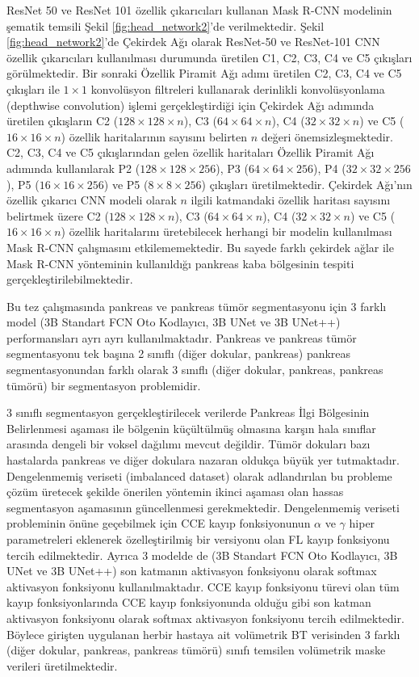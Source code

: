 ResNet 50 ve ResNet 101 özellik çıkarıcıları kullanan Mask R-CNN modelinin şematik temsili Şekil \ref{fig:head_network2}'de verilmektedir. Şekil \ref{fig:head_network2}'de Çekirdek Ağı olarak ResNet-50 ve ResNet-101 CNN özellik çıkarıcıları kullanılması durumunda üretilen C1, C2, C3, C4 ve C5 çıkışları görülmektedir. Bir sonraki Özellik Piramit Ağı adımı üretilen C2, C3, C4 ve C5 çıkışları ile $1 \times 1$ konvolüsyon filtreleri kullanarak derinlikli konvolüsyonlama (depthwise convolution) işlemi gerçekleştirdiği için Çekirdek Ağı adımında üretilen çıkışların C2 ($128 \times 128 \times n$), C3 ($64 \times 64 \times n$), C4 ($32 \times 32 \times n$) ve C5 ($16 \times 16 \times n$) özellik haritalarının sayısını belirten $n$ değeri önemsizleşmektedir. C2, C3, C4 ve C5 çıkışlarından gelen özellik haritaları Özellik Piramit Ağı adımında kullanılarak P2 ($128 \times 128 \times 256$), P3 ($64 \times 64 \times 256$), P4 ($32 \times 32 \times 256$), P5 ($16 \times 16 \times 256$) ve P5 ($8\times 8 \times 256$) çıkışları üretilmektedir. Çekirdek Ağı'nın özellik çıkarıcı CNN modeli olarak $n$ ilgili katmandaki özellik haritası sayısını belirtmek üzere C2 ($128 \times 128 \times n$), C3 ($64 \times 64 \times n$), C4 ($32 \times 32 \times n$) ve C5 ($16 \times 16 \times n$) özellik haritalarını üretebilecek herhangi bir modelin kullanılması Mask R-CNN çalışmasını etkilememektedir. Bu sayede farklı çekirdek ağlar ile Mask R-CNN yönteminin kullanıldığı pankreas kaba bölgesinin tespiti gerçekleştirilebilmektedir.

Bu tez çalışmasında pankreas ve pankreas tümör segmentasyonu için 3 farklı model (3B Standart FCN Oto Kodlayıcı, 3B UNet ve 3B UNet++) performansları ayrı ayrı kullanılmaktadır.
Pankreas ve pankreas tümör segmentasyonu tek başına 2 sınıflı (diğer dokular, pankreas) pankreas segmentasyonundan farklı olarak 3 sınıflı (diğer dokular, pankreas, pankreas tümörü) bir segmentasyon problemidir.

3 sınıflı segmentasyon gerçekleştirilecek verilerde Pankreas İlgi Bölgesinin Belirlenmesi aşaması ile bölgenin küçültülmüş olmasına karşın hala sınıflar arasında dengeli bir voksel dağılımı mevcut değildir. Tümör dokuları bazı hastalarda pankreas ve diğer dokulara nazaran oldukça büyük yer tutmaktadır. Dengelenmemiş veriseti (imbalanced dataset) olarak adlandırılan bu probleme çözüm üretecek şekilde önerilen yöntemin ikinci aşaması olan hassas segmentasyon aşamasının güncellenmesi gerekmektedir. Dengelenmemiş veriseti probleminin önüne geçebilmek için CCE kayıp fonksiyonunun $\alpha$ ve $\gamma$ hiper parametreleri eklenerek özelleştirilmiş bir versiyonu olan FL kayıp fonksiyonu tercih edilmektedir. Ayrıca 3 modelde de (3B Standart FCN Oto Kodlayıcı, 3B UNet ve 3B UNet++) son katmanın aktivasyon fonksiyonu olarak softmax aktivasyon fonksiyonu kullanılmaktadır. CCE kayıp fonksiyonu türevi olan tüm kayıp fonksiyonlarında CCE kayıp fonksiyonunda olduğu gibi son katman aktivasyon fonksiyonu olarak softmax aktivasyon fonksiyonu tercih edilmektedir. Böylece girişten uygulanan herbir hastaya ait volümetrik BT verisinden 3 farklı (diğer dokular, pankreas, pankreas tümörü) sınıfı temsilen volümetrik maske verileri üretilmektedir.


